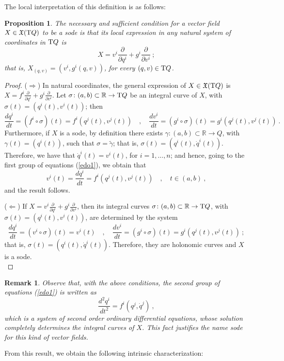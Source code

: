 \documentclass[12pt]{report}
\newtheorem{prop}[teor]{Proposition}
\newtheorem{remark}[teor]{Remark}
\def\beq{\begin{equation}}
\def\eeq{\end{equation}}
\def\dst{\displaystyle}
\def\derpar#1#2{\frac{\partial{#1}}{\partial{#2}}}
\def\qed{\ifvmode\removelastskip\fi
{\unskip\nobreak\hfil\penalty50\hbox{}\nobreak\hfil
\hbox{\vrule height1.2ex width1.2ex}\parfillskip=0pt
\finalhyphendemerits=0 \par\smallskip}}
\def\vf{\mathfrak X}
\def\Real{\mathbb{R}}
\def\Tan{{\rm T}}
\begin{document}
The local interpretation of this definition is as follows:

\begin{prop}
The necessary and sufficient condition for a vector field
$X\in\vf(\Tan Q)$ to be a {\sc sode} is that its local expression
in any natural system of coordinates in $\Tan Q$ is
\beq
X=v^i\derpar{}{q^i}+g^i\derpar{}{v^i} \ ;
\label{cvedso}
\eeq
that is,
$X_{(q,v)}=(v^i,g^i(q,v))$, for every $(q,v)\in\Tan Q$.
\end{prop}
\begin{proof}
($\Longrightarrow$)\quad
In natural coordinates, the general expression of $X\in\vf(\Tan Q)$ is
\(\dst X=f^i\derpar{}{q^i}+g^i\derpar{}{v^i}\).
Let $\sigma\colon (a,b)\subset\Real\to \Tan Q$
be an integral curve of $X$, with $\sigma(t)=(q^i(t),v^i(t))$; then
\beq
\frac{d q^i}{d t}=(f^i\circ\sigma)(t)=f^i(q^j(t),v^j(t))
\quad , \quad
\frac{d v^i}{d t}=(g^i\circ\sigma)(t)=g^i(q^j(t),v^j(t)) \ .
\label{edo1}
\eeq
Furthermore, if $X$ is a {\sc sode}, by definition there exists
$\gamma\colon (a,b)\subset\Real\to Q$, with $\gamma(t)=(q^i(t))$,
such that $\sigma=\widetilde  \gamma$; that is,
$\sigma(t)=(q^i(t),\dot q^i(t))$.
Therefore, we have that $\dot q^i(t)=v^i(t)$, for $i=1,\ldots ,n$;
and hence, going to the first group of equations (\ref{edo1}), we obtain that
$$
v^i(t)=\frac{d q^i}{d t}=f^i(q^j(t),v^j(t)) \quad , \quad t\in (a,b) \ ,
$$
and the result follows.

\quad($\Longleftarrow$)\quad
If \(\dst X=v^i\derpar{}{q^i}+g^i\derpar{}{v^i}\), then its integral curves
$\sigma\colon (a,b)\subset\Real\to \Tan Q$, with $\sigma(t)=(q^i(t),v^i(t))$,
are determined by the system
$$
\frac{d q^i}{d t}=(v^i\circ\sigma)(t)=v^i(t)
\quad , \quad
\frac{d v^i}{d t}=(g^i\circ\sigma)(t)=g^i(q^j(t),v^j(t)) \ ;
$$
that is, $\sigma(t)=(q^i(t),\dot q^i(t))$.
Therefore, they are holonomic curves and $X$ is a {\sc sode}.
\\ \qed  \end{proof}

\begin{remark}{\rm 
Observe that, with the above conditions,
the second group of equations (\ref{edo1}) is written as
$$
\frac{d^2 q^i}{d t^2}=f^i(q^j,\dot q^j) \ ,
$$
which is a system of  second order ordinary differential equations,
whose solution completely determines the integral curves of $X$.
This fact justifies the name {\sc sode} for this kind of vector fields.
}\end{remark}

From this result, we obtain the following intrinsic characterization: 
\end{document}
